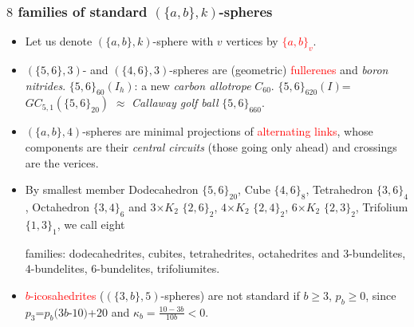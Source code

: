 \documentclass{beamer}
\begin{document}
\begin{frame}\frametitle{$8$ families of standard $(\{a,b\},k)$-spheres}
\vspace{-3mm}
 \begin{itemize}

\item Let us denote $(\{a,b\},k)$-sphere with $v$ vertices by
\textcolor{red}{$\{a,b\}_v$}.




\item $(\{5,6\},3)$- and $(\{4,6\},3)$-spheres are  
(geometric) \textcolor{red}{fullerenes} and {\em boron nitrides}. 
$\{5,6\}_{60}(I_h)$: a new  {\em carbon allotrope} $C_{60}$.
$\{5,6\}_{620}(I)$=$GC_{5,1}(\{5,6\}_{20})$ $\approx$ {\em Callaway golf 
ball} $\{5,6\}_{660}$.

\item $(\{a,b\},4)$-spheres are minimal projections of  
\textcolor{red}{alternating 
links}, 
whose
components are their  {\em central circuits} 
 (those going only ahead) and crossings are the verices.


\item By smallest member Dodecahedron $\{5,6\}_{20}$, Cube 
$\{4,6\}_8$, 
Tetrahedron $\{3,6\}_4$,   Octahedron 
$\{3,4\}_6$ and   $3$$\times $$K_2$ $\{2,6\}_2$, $4$$\times$$K_2$ 
$\{2,4\}_2$, 
$6$$\times $$K_2$ $\{2,3\}_2$,
 Trifolium  $\{1,3\}_1$, we call 
eight

families: dodecahedrites, 
cubites,  tetrahedrites, octahedrites and 
$3$-bundelites, $4$-bundelites,  
$6$-bundelites, trifoliumites. 
\item \textcolor{red}{$b$-icosahedrites} ($(\{3,b\},5)$-spheres)
are not 
standard if $b$$\ge$$3$, $p_b$$\ge$$0$, since $p_3$=$p_b(3b$-$10)$+$20$ and 
$\kappa_b=\frac{10-3b}{10b}<0$.
\end{itemize}
\end{frame}
\end{document}
